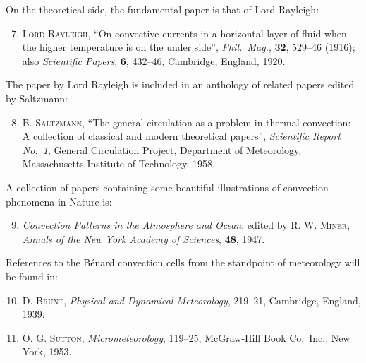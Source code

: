 \noindent On the theoretical side, the fundamental paper is that of Lord Rayleigh:

\begin{enumerate}
\setcounter{enumi}{6}

\item \textsc{Lord Rayleigh}, ``On convective currents in a horizontal layer of fluid
  when the higher temperature is on the under side'', \textit{Phil.\ Mag.},
  \textbf{32}, 529--46 (1916); also \textit{Scientific Papers}, \textbf{6}, 432--46,
  Cambridge, England, 1920.

\end{enumerate}

\noindent The paper by Lord Rayleigh is included in an anthology of related papers edited
by Saltzmann:

\begin{enumerate}
\setcounter{enumi}{7}

\item \textsc{B. Saltzmann}, ``The general circulation as a problem in thermal convection:
  A collection of classical and modern theoretical papers'', \textit{Scientific Report
  No.~1}, General Circulation Project, Department of Meteorology, Massachusetts
  Institute of Technology, 1958.

\end{enumerate}

\noindent A collection of papers containing some beautiful illustrations of convection
phenomena in Nature is:

\begin{enumerate}
\setcounter{enumi}{8}

\item \textit{Convection Patterns in the Atmosphere and Ocean}, edited by
  \textsc{R. W. Miner}, \textit{Annals of the New York Academy of Sciences},
  \textbf{48}, 1947.

\end{enumerate}

\noindent References to the B\'enard convection cells from the standpoint of meteorology
will be found in:

\begin{enumerate}
\setcounter{enumi}{9}

\item \textsc{D. Brunt}, \textit{Physical and Dynamical Meteorology}, 219--21,
  Cambridge, England, 1939.

\item \textsc{O. G. Sutton}, \textit{Micrometeorology}, 119--25, McGraw-Hill Book Co.\
  Inc., New York, 1953.

\end{enumerate}

